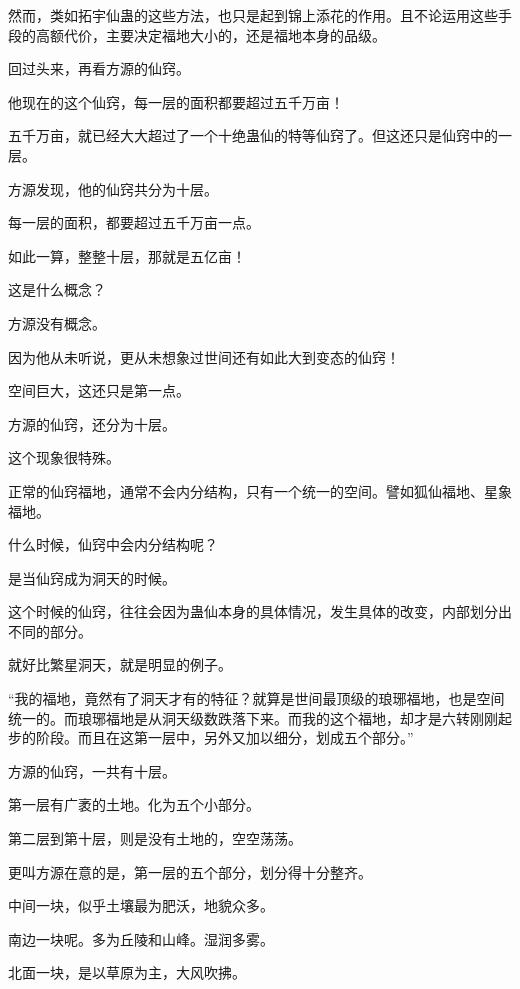 
\begin{this_body}

然而，类如拓宇仙蛊的这些方法，也只是起到锦上添花的作用。且不论运用这些手段的高额代价，主要决定福地大小的，还是福地本身的品级。

回过头来，再看方源的仙窍。

他现在的这个仙窍，每一层的面积都要超过五千万亩！

五千万亩，就已经大大超过了一个十绝蛊仙的特等仙窍了。但这还只是仙窍中的一层。

方源发现，他的仙窍共分为十层。

每一层的面积，都要超过五千万亩一点。

如此一算，整整十层，那就是五亿亩！

这是什么概念？

方源没有概念。

因为他从未听说，更从未想象过世间还有如此大到变态的仙窍！

空间巨大，这还只是第一点。

方源的仙窍，还分为十层。

这个现象很特殊。

正常的仙窍福地，通常不会内分结构，只有一个统一的空间。譬如狐仙福地、星象福地。

什么时候，仙窍中会内分结构呢？

是当仙窍成为洞天的时候。

这个时候的仙窍，往往会因为蛊仙本身的具体情况，发生具体的改变，内部划分出不同的部分。

就好比繁星洞天，就是明显的例子。

“我的福地，竟然有了洞天才有的特征？就算是世间最顶级的琅琊福地，也是空间统一的。而琅琊福地是从洞天级数跌落下来。而我的这个福地，却才是六转刚刚起步的阶段。而且在这第一层中，另外又加以细分，划成五个部分。”

方源的仙窍，一共有十层。

第一层有广袤的土地。化为五个小部分。

第二层到第十层，则是没有土地的，空空荡荡。

更叫方源在意的是，第一层的五个部分，划分得十分整齐。

中间一块，似乎土壤最为肥沃，地貌众多。

南边一块呢。多为丘陵和山峰。湿润多雾。

北面一块，是以草原为主，大风吹拂。


\end{this_body}

